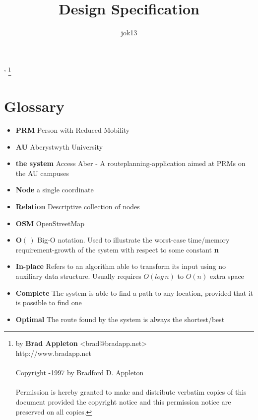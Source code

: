 \documentclass[conference]{IEEEtran}
\title{Design Specification}
\author{jok13}
\date{}
\newcommand\blfootnote[1]{%
	\begingroup
	\renewcommand\thefootnote{}\footnote{#1}%
	\addtocounter{footnote}{-1}%
	\endgroup
}
\begin{document}
\maketitle'
\nocite{*}
\tableofcontents
\blfootnote{by \textbf{Brad Appleton} \textless brad@bradapp.net\textgreater \\http://www.bradapp.net\\\\Copyright \textcopyright\space 1994-1997 by Bradford D. Appleton\\\\Permission is hereby granted to make and distribute verbatim copies of this document provided the copyright notice and this permission notice are preserved on all copies.}


\section*{Glossary}
\begin{itemize}
	\item \textbf{PRM}
	\subitem Person with Reduced Mobility
	\item \textbf{AU}
	\subitem Aberystwyth University
	\item \textbf{the system}
	\subitem Access Aber - A routeplanning-application aimed at PRMs on the AU campuses
	\item \textbf{Node}
	\subitem a single coordinate
	\item \textbf{Relation}
	\subitem Descriptive collection of nodes
	\item \textbf{OSM}
	\subitem OpenStreetMap
	\item $\mathbf{O(\,)}$
	\subitem Big-O notation. Used to illustrate the worst-case time/memory requirement-growth of the system with respect to some constant \textbf{n}
	\item \textbf{In-place}
	\subitem Refers to an algorithm able to transform its input using no auxiliary data structure.
	\subsubitem Usually requires $O(log\, n)$ to $O(n)$ extra space
	\item \textbf{Complete}
	\subitem The system is able to find a path to any location, provided that it is possible to find one
	\item \textbf{Optimal}
	\subitem The route found by the system is always the shortest/best
\end{itemize}
\end{document}
